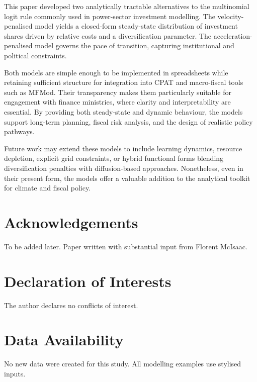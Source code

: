\documentclass[preprint,authoryear,12pt]{elsarticle}
\begin{document}
This paper developed two analytically tractable alternatives to the multinomial logit rule
commonly used in power-sector investment modelling. The velocity-penalised model yields a
closed-form steady-state distribution of investment shares driven by relative costs and a
diversification parameter. The acceleration-penalised model governs the pace of transition,
capturing institutional and political constraints.

Both models are simple enough to be implemented in spreadsheets while retaining sufficient
structure for integration into CPAT and macro-fiscal tools such as MFMod. Their transparency
makes them particularly suitable for engagement with finance ministries, where clarity and
interpretability are essential. By providing both steady-state and dynamic behaviour, the models
support long-term planning, fiscal risk analysis, and the design of realistic policy pathways.

Future work may extend these models to include learning dynamics, resource depletion,
explicit grid constraints, or hybrid functional forms blending diversification penalties with
diffusion-based approaches. Nonetheless, even in their present form, the models offer a valuable
addition to the analytical toolkit for climate and fiscal policy.


\section{Acknowledgements}
To be added later. Paper written with substantial input from Florent McIsaac.

\section*{Declaration of Interests}
The author declares no conflicts of interest.

\section*{Data Availability}
No new data were created for this study. All modelling examples use stylised inputs.
\end{document}
